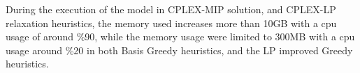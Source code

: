 \documentclass[11pt]{article}
\begin{document}
During the execution of the model in CPLEX-MIP solution, and CPLEX-LP relaxation heuristics, the memory used increases more than 10GB with a cpu usage of around \%90, while the memory usage were limited to 300MB with a cpu usage around \%20 in both Basis Greedy heuristics, and the LP improved Greedy heuristics.\\


\end{document}
